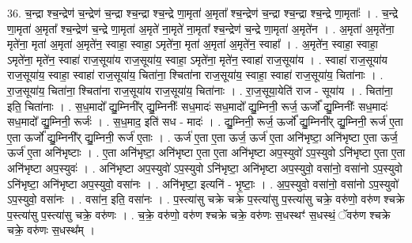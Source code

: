 \documentclass[17pt]{extarticle}
\begin{document}
36. च॒न्द्रा श्च॒न्द्रेण॑ च॒न्द्रेण॑ च॒न्द्रा श्च॒न्द्रा श्च॒न्द्रे णा॒मृता॑ अ॒मृता᳚ श्च॒न्द्रेण॑ च॒न्द्रा श्च॒न्द्रा श्च॒न्द्रे णा॒मृताः᳚ । . च॒न्द्रे णा॒मृता॑ अ॒मृता᳚ श्च॒न्द्रेण॑ च॒न्द्रे णा॒मृता॑ अ॒मृते॑ ना॒मृते॑ ना॒मृता᳚ श्च॒न्द्रेण॑ च॒न्द्रे णा॒मृता॑ अ॒मृते॑न । . अ॒मृता॑ अ॒मृते॑ना॒ मृते॑ना॒ मृता॑ अ॒मृता॑ अ॒मृते॑न॒ स्वाहा॒ स्वाहा॒ ऽमृते॑ना॒ मृता॑ अ॒मृता॑ अ॒मृते॑न॒ स्वाहा᳚ । . अ॒मृते॑न॒ स्वाहा॒ स्वाहा॒ ऽमृते॑ना॒ मृते॑न॒ स्वाहा॑ राज॒सूया॑य राज॒सूया॑य॒ स्वाहा॒ ऽमृते॑ना॒ मृते॑न॒ स्वाहा॑ राज॒सूया॑य । . स्वाहा॑ राज॒सूया॑य राज॒सूया॑य॒ स्वाहा॒ स्वाहा॑ राज॒सूया॑य॒ चिता॑ना॒ श्चिता॑ना राज॒सूया॑य॒ स्वाहा॒ स्वाहा॑ राज॒सूया॑य॒ चिता॑नाः । . रा॒ज॒सूया॑य॒ चिता॑ना॒ श्चिता॑ना राज॒सूया॑य राज॒सूया॑य॒ चिता॑नाः । . रा॒ज॒सूया॒येति॑ राज - सूया॑य । . चिता॑ना॒ इति॒ चिता॑नाः । . स॒ध॒मादो᳚ द्यु॒म्निनी᳚र् द्यु॒म्निनीः᳚ सध॒मादः॑ सध॒मादो᳚ द्यु॒म्निनी॒ रूर्ज॒ ऊर्जो᳚ द्यु॒म्निनीः᳚ सध॒मादः॑ सध॒मादो᳚ द्यु॒म्निनी॒ रूर्जः॑ । . स॒ध॒माद॒ इति॑ सध - मादः॑ । . द्यु॒म्निनी॒ रूर्ज॒ ऊर्जो᳚ द्यु॒म्निनी᳚र् द्यु॒म्निनी॒ रूर्ज॑ ए॒ता ए॒ता ऊर्जो᳚ द्यु॒म्निनी᳚र् द्यु॒म्निनी॒ रूर्ज॑ ए॒ताः । . ऊर्ज॑ ए॒ता ए॒ता ऊर्ज॒ ऊर्ज॑ ए॒ता अनि॑भृष्टा॒ अनि॑भृष्टा ए॒ता ऊर्ज॒ ऊर्ज॑ ए॒ता अनि॑भृष्टाः । . ए॒ता अनि॑भृष्टा॒ अनि॑भृष्टा ए॒ता ए॒ता अनि॑भृष्टा अप॒स्युवो॑ ऽप॒स्युवो ऽनि॑भृष्टा ए॒ता ए॒ता अनि॑भृष्टा अप॒स्युवः॑ । . अनि॑भृष्टा अप॒स्युवो॑ ऽप॒स्युवो ऽनि॑भृष्टा॒ अनि॑भृष्टा अप॒स्युवो॒ वसा॑नो॒ वसा॑नो ऽप॒स्युवो ऽनि॑भृष्टा॒ अनि॑भृष्टा अप॒स्युवो॒ वसा॑नः । . अनि॑भृष्टा॒ इत्यनि॑ - भृ॒ष्टाः॒ । . अ॒प॒स्युवो॒ वसा॑नो॒ वसा॑नो ऽप॒स्युवो॑ ऽप॒स्युवो॒ वसा॑नः । . वसा॑न॒ इति॒ वसा॑नः । . प॒स्त्या॑सु चक्रे चक्रे प॒स्त्या॑सु प॒स्त्या॑सु चक्रे॒ वरु॑णो॒ वरु॑ण श्चक्रे प॒स्त्या॑सु प॒स्त्या॑सु चक्रे॒ वरु॑णः । . च॒क्रे॒ वरु॑णो॒ वरु॑ण श्चक्रे चक्रे॒ वरु॑णः स॒धस्थꣳ॑ स॒धस्थं॒ ॅवरु॑ण श्चक्रे चक्रे॒ वरु॑णः स॒धस्थ᳚म् । \newline
\end{document}
